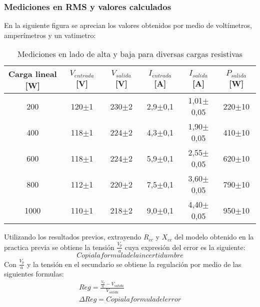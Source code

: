 \documentclass[11pt,letterpaper]{article}     %
\begin{document}
\subsubsection{Mediciones en RMS y valores calculados}
En la siguiente figura se aprecian los valores obtenidos por medio de  voltímetros, amperímetros y un vatimetro:
\begin{table}[H]
\centering
\caption{Mediciones en lado de alta y baja para diversas cargas resistivas}
\label{experiencia1}
\begin{tabular}{|c|c|c|c|c|c|}
\hline
\textbf{Carga lineal {[}W{]}} & \textbf{$V_{entrada}$ {[}V{]}} & \textbf{$V_{salida}$ {[}V{]}} & \textbf{$I_{entrada}$ {[}A{]}} & \textbf{$I_{salida}$ {[}A{]}} & \textbf{$P_{salida}$ {[}W{]}} \\ \hline
200                           & 120$\pm$1                      & 230$\pm$2                     & 2,9$\pm$0,1                    & 1,01$\pm$0,05                 & 220$\pm$10                    \\ \hline
400                           & 118$\pm$1                      & 224$\pm$2                     & 4,3$\pm$0,1                    & 1,90$\pm$0,05                 & 410$\pm$10                    \\ \hline
600                           & 118$\pm$1                      & 224$\pm$2                     & 5,9$\pm$0,1                    & 2,55$\pm$0,05                 & 620$\pm$10                    \\ \hline
800                           & 112$\pm$1                      & 220$\pm$2                     & 7,5$\pm$0,1                    & 3,60$\pm$0,05                 & 790$\pm$10                    \\ \hline
1000                          & 110$\pm$1                      & 218$\pm$2                     & 9,0$\pm$0,1                    & 4,40$\pm$0,05                 & 950$\pm$10                    \\ \hline
\end{tabular}
\end{table}
Utilizando los resultados previos, extrayendo $R_{cc}$ y $X_{cc}$ del modelo obtenido en la practica previa se obtiene la tensión $\frac{V_{p}}{a}$ cuya expresión del error es la siguiente:
\begin{equation}
    Copia la formula de la incertidumbre
\end{equation}
Con $\frac{V_{p}}{a}$ y la tensión en el secundario se obtiene la regulación por medio de las siguientes formulas:
\begin{align}
    Reg = \frac{\frac{V_{p}}{a}-V_{salida}}{V_{salida}}\\
    \Delta Reg = Copia la formula del error
\end{align}
\end{document}
